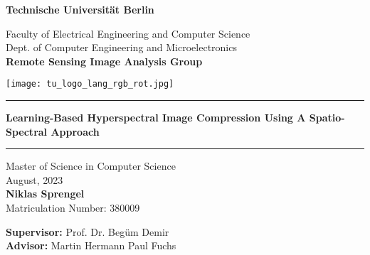 \thispagestyle{empty}
\begin{center}

{\LARGE \textbf{Technische Universit{\"a}t Berlin}}

\vspace{0.6cm}

{\large Faculty of Electrical Engineering and Computer Science\\[1mm]}
{\large Dept. of Computer Engineering and Microelectronics\\[1mm]}
{\large \textbf{Remote Sensing Image Analysis Group}\\[5mm]}

\vspace*{0.5cm}

\texttt{[image: tu\_logo\_lang\_rgb\_rot.jpg]} %

\vspace{0.2cm}
\begin{center}
\rule{0.85\textwidth}{.4pt}
\end{center}
\vspace{0.2cm}
{\LARGE \textbf{Learning-Based Hyperspectral Image Compression Using A Spatio-Spectral Approach}} %
\begin{center}
\rule{0.85\textwidth}{.4pt}
\end{center}
\vspace{0.5cm}
{\LARGE Master of Science in Computer Science}\\
\vspace*{0.2cm}
{\large August, 2023}\\ %
\vspace*{0.5cm}
{\LARGE \textbf{Niklas Sprengel}}
\\
\vspace*{0.5cm}
{\large Matriculation Number: 380009} \\
\vspace*{0.5cm}
\begin{flushleft}
\hspace*{1.2cm}
{\large \textbf{Supervisor:}} \hspace*{0.5cm} {\large Prof. Dr. Beg{\"u}m Demir}\\
\vspace*{0.5cm}
\hspace*{1.2cm}
{\large \textbf{Advisor:}} \hspace*{1.15cm} {\large Martin Hermann Paul Fuchs}
\vspace{2cm}
\end{flushleft}

\end{center}



